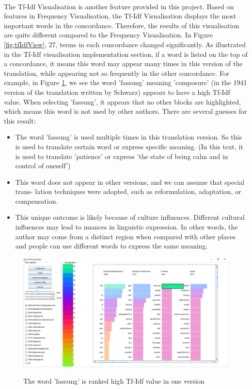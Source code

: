 \paragraph[]{}The Tf-Idf Visualisation is another feature provided in this project. Based on features in Frequency Visualisation, the Tf-Idf Visualisation displays the most important words in the concordance. Therefore, the results of this visualisation are quite different compared to the Frequency Visualisation. In Figure \ref{fig:tfIdfView}, 27, terms in each concordance changed significantly. As illustrated in the Tf-Idf visualisation implementation section, if a word is listed on the top of a concordance, it means this word may appear many times in this version of the translation, while appearing not so frequently in the other concordance. For example, in Figure \ref{fig:fassung}, we see the word 'fassung' meaning 'composure' (in the 1941 version of the translation written by Schwarz) appears to have a high Tf-Idf value. When selecting 'fassung', it appears that no other blocks are highlighted, which means this word is not used by other authors. There are several guesses for this result:
\begin{itemize} 	
	\item \textbf{} The word 'fassung' is used multiple times in this translation version. So this is used to translate certain word or express specific meaning. (In this text, it is used to translate 'patience' or express 'the state of being calm and in control of oneself')
	\item \textbf{} This word does not appear in other versions, and we can assume that special trans- lation techniques were adopted, such as reformulation, adaptation, or compensation. 
	\item \textbf{} This unique outcome is likely because of  culture influences. Different cultural influences may lead to nuances in linguistic expression. In other words, the author may come from a distinct region when compared with other places and people can use different words to express the same meaning.
\end{itemize} 

\begin{figure}[H]
	\centering	
	\includegraphics[scale=0.5]{Figs/Fassung}\\[1ex]
	\caption{The word 'fassung' is ranked high Tf-Idf value in one version}
	\label{fig:fassung}
\end{figure} 

